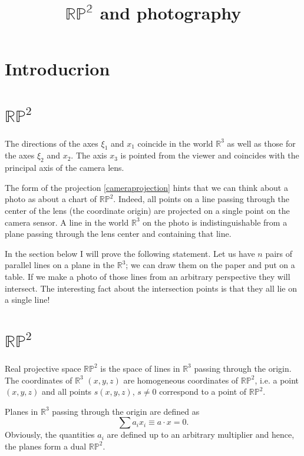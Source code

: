 \documentclass[a4paper,10pt]{article}
\title{$\mathbb{RP^2}$ and photography}
\author{}
\date{}
\begin{document}
\maketitle
\section{Introducrion}




\section{$\mathbb{RP}^2$}


The directions of the axes $\xi_1$ and $x_1$ coincide in the world $\mathbb{R}^3$ as well as those for the axes  $\xi_2$ and $x_2$. The axis $x_3$ is pointed from the viewer and coincides with the principal axis of the camera lens. 

The form of the projection \eqref{cameraprojection} hints that we can think about a photo as about a chart of $\mathbb{RP}^2$. Indeed, all points on a line passing through the center of the lens (the coordinate origin) are projected on a single point on the camera sensor. A line in the world $\mathbb{R}^3$ on the photo is indistinguishable from a plane passing through the lens center and containing that line.  

In the section below I will prove the following statement. Let us have $n$ pairs of parallel lines on a plane in the $\mathbb{R}^3$; we can draw them on the paper and put on a table. If we make a photo of those lines from an arbitrary perspective they will intersect. The interesting fact about  the intersection points is that they all lie on a single line!

\section{$\mathbb{RP}^2$ }
 Real projective space $\mathbb{RP}^2$ is the space of lines in $\mathbb{R}^{3}$ passing through the origin. The coordinates of $\mathbb{R}^3$ $(x,y,z)$ are homogeneous coordinates of $\mathbb{RP}^2$, i.e. a point $(x,y,z)$ and all points $s(x,y,z)$, $s\neq 0$ correspond to a point of $\mathbb{RP}^2$.  

Planes in $\mathbb{R}^3$ passing through the origin are defined as 
\begin{equation}
\sum a_i x_i \equiv a\cdot x= 0.
\end{equation}
 Obviously, the quantities $a_i$ are defined up to an arbitrary multiplier and hence, the planes form a dual $\mathbb{RP}^2$. 
 
\end{document}
